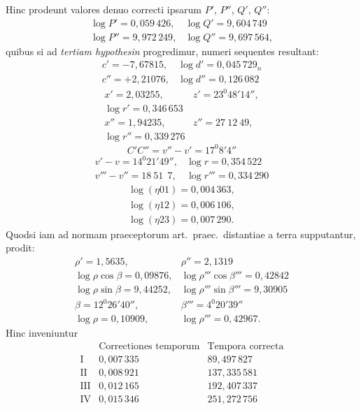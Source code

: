 Hinc prodeunt valores denuo correcti ipsarum $P'$, $P''$, $Q'$, $Q''$:
\[
\begin{array}{ll}
\log P' = 0{,}059\,426, & \log Q' = 9{,}604\,749 \\
\log P'' = 9{,}972\,249, & \log Q'' = 9{,}697\,564,
\end{array}
\]
quibus si ad \emph{tertiam hypothesin} progredimur, numeri sequentes
resultant:
\[
\begin{array}{ll}
c' = -7{,}67815, & \log d' = 0{,}045\,729_n \\
c'' = +2{,}21076, & \log d'' = 0{,}126\,082
\end{array}
\]
\[
\begin{array}{ll}
x' = 2{,}03255, & z' = 23^{0}48'14'',\\
\log r' = 0{,}346\,653 & \\
x'' = 1{,}94235, & z'' = 27\ 12\ 49,\\
\log r'' = 0{,}339\,276 & 
\end{array}
\]
\[
C'C'' = v''-v' = 17^{0}8'4''
\]
\[
\begin{array}{ll}
v'-v = 14^{0}21'49'', & \log r = 0{,}354\,522 \\
v'''-v'' = 18\ 51\ \ 7, & \log r''' = 0{,}334\,290
\end{array}
\]
\[
\begin{gathered}
\log(\eta 01) = 0{,}004\,363, \\ \log(\eta 12) = 0{,}006\,106, \\ \log(\eta 23) = 0{,}007\,290.
\end{gathered}
\]
Quodsi iam ad normam praeceptorum art.\ praec.\ distantiae a terra
supputantur, prodit:
\[
\begin{array}{ll}
\rho' = 1{,}5635, & \rho'' = 2{,}1319 \\
\log \rho \cos\beta = 0{,}09876, & \log \rho'''\cos\beta''' = 0{,}42842 \\
\log \rho \sin\beta = 9{,}44252, & \log \rho'''\sin\beta''' = 9{,}30905 \\
\beta = 12^{0}26'40'', & \beta''' = 4^{0}20'39'' \\
\log \rho = 0{,}10909, & \log \rho''' = 0{,}42967.
\end{array}
\]
Hinc inveniuntur
\[
\begin{array}{c|c|c}
 & \text{Correctiones temporum} & \text{Tempora correcta} \\
\hline
\text{I} & 0{,}007\,335 & 89{,}497\,827 \\
\text{II} & 0{,}008\,921 & 137{,}335\,581 \\
\text{III} & 0{,}012\,165 & 192{,}407\,337 \\
\text{IV} & 0{,}015\,346 & 251{,}272\,756
\end{array}
\]
